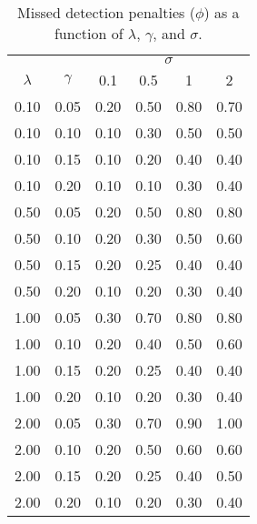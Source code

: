 \begin{table}[ht]
\centering
\begin{tabular}{cc|cccc}
  \hline
  & & \multicolumn{4}{c}{$\sigma$} \\
  \cline{3-6}
 $\lambda$ & $\gamma$ & 0.1 & 0.5 & 1 & 2 \\ 
  \hline
   0.10 & 0.05 & 0.20 & 0.50 & 0.80 & 0.70 \\ 
   0.10 & 0.10 & 0.10 & 0.30 & 0.50 & 0.50 \\ 
   0.10 & 0.15 & 0.10 & 0.20 & 0.40 & 0.40 \\ 
   0.10 & 0.20 & 0.10 & 0.10 & 0.30 & 0.40 \\ 
   0.50 & 0.05 & 0.20 & 0.50 & 0.80 & 0.80 \\ 
   0.50 & 0.10 & 0.20 & 0.30 & 0.50 & 0.60 \\ 
   0.50 & 0.15 & 0.20 & 0.25 & 0.40 & 0.40 \\ 
   0.50 & 0.20 & 0.10 & 0.20 & 0.30 & 0.40 \\ 
   1.00 & 0.05 & 0.30 & 0.70 & 0.80 & 0.80 \\ 
   1.00 & 0.10 & 0.20 & 0.40 & 0.50 & 0.60 \\ 
   1.00 & 0.15 & 0.20 & 0.25 & 0.40 & 0.40 \\ 
   1.00 & 0.20 & 0.10 & 0.20 & 0.30 & 0.40 \\ 
   2.00 & 0.05 & 0.30 & 0.70 & 0.90 & 1.00 \\ 
   2.00 & 0.10 & 0.20 & 0.50 & 0.60 & 0.60 \\ 
   2.00 & 0.15 & 0.20 & 0.25 & 0.40 & 0.50 \\ 
   2.00 & 0.20 & 0.10 & 0.20 & 0.30 & 0.40 \\ 
   \hline
\end{tabular}
\caption{Missed detection penalties ($\phi$) as a function of $\lambda$, $\gamma$, and $\sigma$.}
\label{tab:Phi_Penalties}
\end{table}


